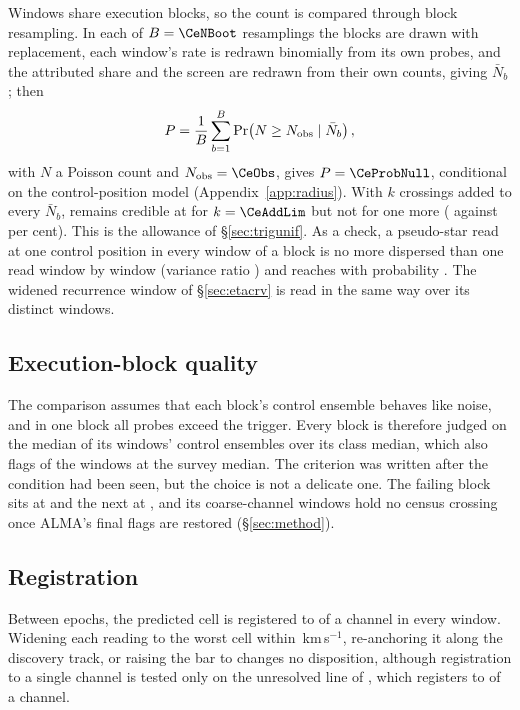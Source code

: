 Windows share execution blocks, so the count is compared through block
resampling. In each of $B=\CeNBoot$ resamplings the blocks are drawn with
replacement, each window's rate is redrawn binomially from its own probes,
and the attributed share and the screen are redrawn from their own counts,
giving $\bar N_b$; then
\begin{equation*}
P=\frac{1}{B}\sum_{b=1}^{B}\Pr\!\left(N\ge N_{\rm obs}\mid\bar N_b\right),
\end{equation*}
with $N$ a Poisson count and $N_{\rm obs}=\CeObs$, gives $P=\CeProbNull$,
conditional on the control-position model (Appendix~\ref{app:radius}). With
$k$ crossings added to every $\bar N_b$, \CeObs{} remains credible at
\CeProbAtLim{} for $k=\CeAddLim$ but not for one more (\CeProbAboveLim{}
against \CeAlphaPct{} per cent). This is the allowance of
\S\ref{sec:trigunif}. As a check, a pseudo-star read at one control position in every window of
a block is no more dispersed than one read window by window (variance ratio
\BgDisp) and reaches \CeObs{} with probability \BgPseudoP. The widened recurrence window
of \S\ref{sec:etacrv} is read in the same way over its \WuNWin{} distinct
windows.

\subsection{Execution-block quality}
\label{sec:blockquality}

The comparison assumes that each block's control ensemble behaves like
noise, and in one block all \NCtrl{} probes exceed the trigger. Every block
is therefore judged on the median of its windows' control ensembles over its
class median, which also flags \DqNWin{} of the \NWindows{} windows at
\BqFactor{} the survey median. The criterion was written after the condition
had been seen, but the choice is not a delicate one. The failing block sits
at \BqFailQ{} and the next at \BqNextQ, and its \BqFailNWin{} coarse-channel
windows hold no census crossing once ALMA's final flags are restored
(\S\ref{sec:method}).

\subsection{Registration}
\label{sec:regbudget}

Between epochs, the predicted cell is registered to \RgBudgetChMed{} of a
channel in every window. Widening each reading to the worst cell within
\RgTolKms\,km\,s$^{-1}$, re-anchoring it along the discovery track, or
raising the bar to \ZtTrialThr{} changes no disposition, although
registration to a single channel is tested only on the unresolved line of
\RgRegStar, which registers to \RgRegMaxCh{} of a channel.


